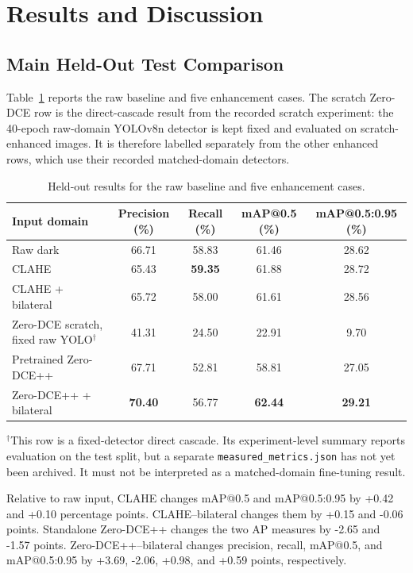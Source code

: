\documentclass[11pt,a4paper]{article}
\begin{document}
\section{Results and Discussion}

\subsection{Main Held-Out Test Comparison}

Table~\ref{tab:main-test} reports the raw baseline and five enhancement cases.
The scratch Zero-DCE row is the direct-cascade result from the recorded scratch
experiment: the
40-epoch raw-domain YOLOv8n detector is kept fixed and evaluated on
scratch-enhanced images. It is therefore labelled separately from the other
enhanced rows, which use their recorded matched-domain detectors.

\begin{table}[H]
\centering
\caption{Held-out results for the raw baseline and five enhancement cases.}
\label{tab:main-test}
\small
\begin{tabularx}{\textwidth}{>{\raggedright\arraybackslash}Xcccc}
\toprule
Input domain & Precision (\%) & Recall (\%) & mAP@0.5 (\%) & mAP@0.5:0.95 (\%) \\
\midrule
Raw dark & 66.71 & 58.83 & 61.46 & 28.62 \\
CLAHE & 65.43 & \textbf{59.35} & 61.88 & 28.72 \\
CLAHE + bilateral & 65.72 & 58.00 & 61.61 & 28.56 \\
Zero-DCE scratch, fixed raw YOLO\(^{\dagger}\) & 41.31 & 24.50 & 22.91 & 9.70 \\
Pretrained Zero-DCE++ & 67.71 & 52.81 & 58.81 & 27.05 \\
Zero-DCE++ + bilateral & \textbf{70.40} & 56.77 & \textbf{62.44} & \textbf{29.21} \\
\bottomrule
\end{tabularx}
\vspace{0.4em}

\begin{minipage}{0.97\textwidth}
\footnotesize
\(^{\dagger}\)This row is a fixed-detector direct cascade. Its experiment-level
summary reports evaluation on the test split, but a separate
\texttt{measured\_metrics.json} has not yet been archived. It must not be
interpreted as a matched-domain fine-tuning result.
\end{minipage}
\end{table}

Relative to raw input, CLAHE changes mAP@0.5 and mAP@0.5:0.95 by +0.42 and
+0.10 percentage points. CLAHE--bilateral changes them by +0.15 and -0.06
points. Standalone Zero-DCE++ changes the two AP measures by -2.65 and -1.57
points. Zero-DCE++--bilateral changes precision, recall, mAP@0.5, and
mAP@0.5:0.95 by +3.69, -2.06, +0.98, and +0.59 points, respectively.
\end{document}
